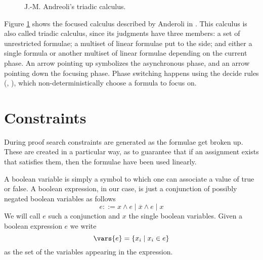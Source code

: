 \begin{figure}[h!]
	\centering
	
	\caption{J.-M. Andreoli's triadic calculus.\label{fig:triadic}}
\end{figure}
Figure \ref{fig:triadic} shows the focused calculus described by Anderoli in \cite{Focusing}.
This calculus is also called triadic calculus, since its judgments have three members: a set of unrestricted formulae; a multiset of linear formulae put to the side; and either a single formula or another multiset of linear formulae depending on the current phase.
An arrow pointing up symbolizes the asynchronous phase, and an arrow pointing down the focusing phase.
Phase switching happens using the decide rules (\derRule[A]{\displaydecide[1]}, \derRule[A]{\displaydecide[2]}), which non-deterministically choose a formula to focus on.

\section{Constraints}
During proof search constraints are generated as the formulae get broken up.
These are created in a particular way, as to guarantee that if an assignment exists that satisfies them, then the formulae have been used linearly.
\begin{define}
	\label{def:bool expr}
	A boolean variable is simply a symbol to which one can associate a value of true or false.
	A boolean expression, in our case, is just a conjunction of possibly negated boolean variables as follows
	$$ e ::= x \wedge e \mid \overline{x} \wedge e \mid x $$
	We will call $e$ such a conjunction and $x$ the single boolean variables.
	Given a boolean expression $e$ we write
	$$ \vars{e} = \{ x_i \mid x_i \in e \} $$
	as the set of the variables appearing in the expression.
\end{define}

